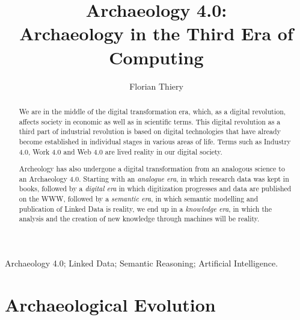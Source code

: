 \documentclass[twocolumn]{autart}
\begin{document}
\begin{frontmatter}

\title{Archaeology 4.0: \protect\\ Archaeology in the Third Era of Computing}
                                               

\author[FT]{Florian Thiery}

\address[FT]{Research Software Engineer, Mainz, Germany}  %

          
\begin{keyword}                             
Archaeology 4.0; Linked Data; Semantic Reasoning; Artificial Intelligence. 
\end{keyword}

\begin{abstract}                         

We are in the middle of the digital transformation era, which, as a digital revolution, affects society in economic as well as in scientific terms. This digital revolution as a third part of industrial revolution is based on digital technologies that have already become established in individual stages in various areas of life. Terms such as Industry 4.0, Work 4.0 and Web 4.0 are lived reality in our digital society.

Archeology has also undergone a digital transformation from an analogous science to an Archaeology 4.0. Starting with an \textit{analogue era}, in which research data was kept in books, followed by a \textit{digital era} in which digitization progresses and data are published on the WWW, followed by a \textit{semantic era}, in which semantic modelling and publication of Linked Data is reality, we end up in a \textit{knowledge era}, in which the analysis and the creation of new knowledge through machines will be reality.

\end{abstract}

\end{frontmatter}

\section{Archaeological Evolution}
\end{document}
